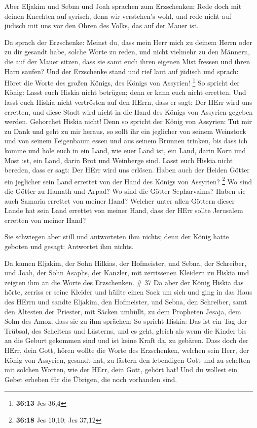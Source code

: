  Aber Eljakim und Sebna und Joah sprachen zum Erzschenken:
Rede doch mit deinen Knechten auf syrisch, denn wir verstehen's wohl,
und rede nicht auf jüdisch mit uns vor den Ohren des Volks, das auf der
Mauer ist.

 Da sprach der Erzschenke: Meinst du, dass mein Herr mich
zu deinem Herrn oder zu dir gesandt habe, solche Worte zu reden, und
nicht vielmehr zu den Männern, die auf der Mauer sitzen, dass sie samt
euch ihren eigenen Mist fressen und ihren Harn saufen?  Und
der Erzschenke stand und rief laut auf jüdisch und sprach: Höret die
Worte des großen Königs, des Königs von Assyrien! \footnote{\textbf{36:13}
  Jes 36,4}  So spricht der König: Lasst euch Hiskia nicht
betrügen; denn er kann euch nicht erretten.  Und lasst euch
Hiskia nicht vertrösten auf den HErrn, dass er sagt: Der HErr wird uns
erretten, und diese Stadt wird nicht in die Hand des Königs von Assyrien
gegeben werden.  Gehorchet Hiskia nicht! Denn so spricht
der König von Assyrien: Tut mir zu Dank und geht zu mir heraus, so sollt
ihr ein jeglicher von seinem Weinstock und von seinem Feigenbaum essen
und aus seinem Brunnen trinken,  bis dass ich komme und
hole euch in ein Land, wie euer Land ist, ein Land, darin Korn und Most
ist, ein Land, darin Brot und Weinberge sind.  Lasst euch
Hiskia nicht bereden, dass er sagt: Der HErr wird uns erlösen. Haben
auch der Heiden Götter ein jeglicher sein Land errettet von der Hand des
Königs von Assyrien? \footnote{\textbf{36:18} Jes 10,10; Jes 37,12}
 Wo sind die Götter zu Hamath und Arpad? Wo sind die Götter
Sepharvaims? Haben sie auch Samaria errettet von meiner Hand?
 Welcher unter allen Göttern dieser Lande hat sein Land
errettet von meiner Hand, dass der HErr sollte Jerusalem erretten von
meiner Hand?

 Sie schwiegen aber still und antworteten ihm nichts; denn
der König hatte geboten und gesagt: Antwortet ihm nichts.

 Da kamen Eljakim, der Sohn Hilkias, der Hofmeister, und
Sebna, der Schreiber, und Joah, der Sohn Asaphs, der Kanzler, mit
zerrissenen Kleidern zu Hiskia und zeigten ihm an die Worte des
Erzschenken. \# 37  Da aber der König Hiskia das hörte,
zerriss er seine Kleider und hüllte einen Sack um sich und ging in das
Haus des HErrn  und sandte Eljakim, den Hofmeister, und
Sebna, den Schreiber, samt den Ältesten der Priester, mit Säcken
umhüllt, zu dem Propheten Jesaja, dem Sohn des Amoz,  dass
sie zu ihm sprächen: So spricht Hiskia: Das ist ein Tag der Trübsal, des
Scheltens und Lästerns, und es geht, gleich als wenn die Kinder bis an
die Geburt gekommen sind und ist keine Kraft da, zu gebären.
 Dass doch der HErr, dein Gott, hören wollte die Worte des
Erzschenken, welchen sein Herr, der König von Assyrien, gesandt hat, zu
lästern den lebendigen Gott und zu schelten mit solchen Worten, wie der
HErr, dein Gott, gehört hat! Und du wollest ein Gebet erheben für die
Übrigen, die noch vorhanden sind.

